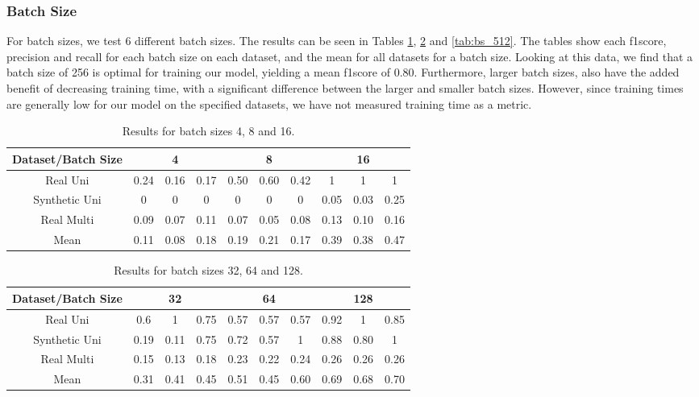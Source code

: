 \subsubsection{Batch Size}
For batch sizes, we test 6 different batch sizes. The results can be seen in Tables \ref{tab:bs_16}, \ref{tab:bs_128} and \ref{tab:bs_512}. The tables show each \gls{f1score}, \gls{precision} and \gls{recall} for each batch size on each dataset, and the mean for all datasets for a batch size. Looking at this data, we find that a batch size of 256 is optimal for training our model, yielding a mean \gls{f1score} of 0.80. Furthermore, larger batch sizes, also have the added benefit of decreasing training time, with a significant difference between the larger and smaller batch sizes. However, since training times are generally low for our model on the specified datasets, we have not measured training time as a metric.

\bgroup
\def\arraystretch{1.8}
\begin{table}[htbp]
\centering
\begin{tabular}{|c|c|c|c|c|c|c|c|c|c|}
\hline
Dataset/Batch Size              & \multicolumn{3}{c|}{4} & \multicolumn{3}{c|}{8} & \multicolumn{3}{c|}{16} \\ \hline
Real Uni      & 0.24   & 0.16  & 0.17  & 0.50   & 0.60  & 0.42  & 1      & 1      & 1     \\ \hline
Synthetic Uni & 0      & 0     & 0     & 0      & 0     & 0     & 0.05   & 0.03   & 0.25  \\ \hline
Real Multi    & 0.09   & 0.07  & 0.11  & 0.07  & 0.05 & 0.08 & 0.13   & 0.10   & 0.16  \\ \hline
Mean          & 0.11   & 0.08  & 0.18  & 0.19   & 0.21  & 0.17  & 0.39   & 0.38   & 0.47  \\ \hline
\end{tabular}
\caption{Results for batch sizes 4, 8 and 16.}
\label{tab:bs_16}
\end{table}
\egroup

\bgroup
\def\arraystretch{1.8}
\begin{table}[htbp]
\centering
\begin{tabular}{|c|c|c|c|c|c|c|c|c|c|}
\hline
Dataset/Batch Size              & \multicolumn{3}{c|}{32} & \multicolumn{3}{c|}{64} & \multicolumn{3}{c|}{128} \\ \hline
Real Uni      & 0.6    & 1      & 0.75  & 0.57   & 0.57   & 0.57  & 0.92   & 1      & 0.85   \\ \hline
Synthetic Uni & 0.19   & 0.11   & 0.75  & 0.72   & 0.57   & 1     & 0.88   & 0.80   & 1      \\ \hline
Real Multi    & 0.15   & 0.13   & 0.18  & 0.23   & 0.22   & 0.24  & 0.26   & 0.26   & 0.26   \\ \hline
Mean          & 0.31   & 0.41   & 0.45  & 0.51   & 0.45   & 0.60  & 0.69   & 0.68   & 0.70   \\ \hline
\end{tabular}
\caption{Results for batch sizes 32, 64 and 128.}
\label{tab:bs_128}
\end{table}
\egroup

